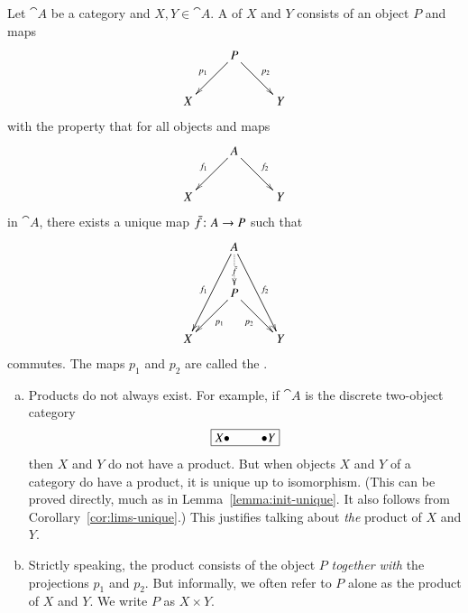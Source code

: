 \begin{defn}    
\label{defn:bin-prod}
Let $\cat{A}$ be a category and $X, Y \in \cat{A}$.  A %
%
%
of $X$ and $Y$ consists of an object $P$ and maps
\[
\xymatrix{
        &P \ar[ld]_{p_1} \ar[rd]^{p_2}  &       \\
X       &                               &Y
}
\]
with the property that for all objects and maps
% 
\begin{equation}        
\label{eq:bin-prod-cone}
\begin{array}{c}
\xymatrix{
        &A \ar[ld]_{f_1} \ar[rd]^{f_2}  &       \\
X       &                               &Y
}
\end{array}
\end{equation}
% 
in $\cat{A}$, there exists a unique map $\bar{f}\from A \to P$ such that 
% 
\begin{equation}        
\label{eq:bin-prod-lim}
\begin{array}{c}
\xymatrix{
        &A \ar[ldd]_{f_1} \ar@{.>}[d]|{\bar{f}\vphantom{\bar{\bar{f}}}} 
\ar[rdd]^{f_2}&       \\
        &P \ar[ld]^{p_1} \ar[rd]_{p_2}                  &       \\
X       &                                               &Y
}
\end{array}
\end{equation}
% 
commutes.  The maps $p_1$ and $p_2$ are called the .%
%
%
\end{defn}

\begin{remarks} 
\label{rmks:prod}
\begin{enumerate}[(b)]
\item   
\label{rmks:prod:exist}
Products do not always exist.  For example, if $\cat{A}$ is the discrete
two-object category
\[
\fbox{$X\bullet$ \hspace*{2em} $\bullet Y$}
\]
then $X$ and $Y$ do not have a product.  But when objects $X$ and $Y$ of a
category do have a product, it is unique%
%
%
up to isomorphism.  (This can be proved directly, much as in
Lemma~\ref{lemma:init-unique}.  It also follows from
Corollary~\ref{cor:lims-unique}.)  This justifies talking about \emph{the}
product of $X$ and $Y$.

\item 
Strictly speaking, the product consists of the object $P$ \emph{together
  with} the projections $p_1$ and $p_2$.  But informally,%
%
%
we often refer to $P$ alone as the product of $X$ and $Y$.  We write $P$ as
$X \times Y$.%
%
%
\end{enumerate}
\end{remarks}


